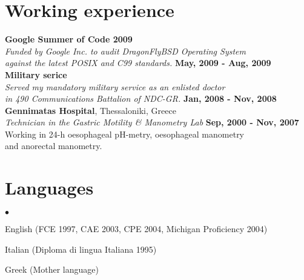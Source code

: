 \documentclass[margin,line]{res}
\newenvironment{list2}{
  \begin{list}{$\bullet$}{%
      \setlength{\itemsep}{0in}
      \setlength{\parsep}{0in} \setlength{\parskip}{0in}
      \setlength{\topsep}{0in} \setlength{\partopsep}{0in}
      \setlength{\leftmargin}{0.2in}}}{\end{list}}
\begin{document}
\begin{resume}
\section{\sc Working experience}
{\bf Google Summer of Code 2009}\\
{\em Funded by Google Inc. to audit DragonFlyBSD Operating System\\ against the latest POSIX and C99 standards.}
\hfill {\bf May, 2009 - Aug, 2009}\\

{\bf Military serice}\\
{\em Served my mandatory military service as an enlisted doctor\\in 490 Communications Battalion of NDC-GR.}
\hfill {\bf Jan, 2008 - Nov, 2008}\\

{\bf Gennimatas Hospital}, Thessaloniki, Greece\\
{\em Technician in the Gastric Motility \& Manometry Lab} \hfill {\bf Sep, 2000 - Nov, 2007}\\
Working in 24-h oesophageal pH-metry, oesophageal manometry\\
and anorectal manometry.

\section{\sc Languages}
\begin{list2}
\item English (FCE 1997, CAE 2003, CPE 2004, Michigan Proficiency 2004)
\item Italian (Diploma di lingua Italiana 1995)
\item Greek (Mother language)
\end{list2}


\end{resume}
\end{document}
